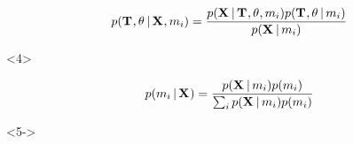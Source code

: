 \begin{frame}[t]
\begin{minipage}[t][0.35\textheight][t]{\linewidth}
\begin{uncoverenv}
\begin{displaybox}[0.85\linewidth]
\begin{minipage}[c][0.1\textheight][c]{\linewidth}
\begin{onlyenv}
                        \[
                            p(
                              \divTimeMapVector,
                              \allParameters{}
                              \given \alignmentVector, \divModel{i})
                              =
                            \frac{
                                p(\alignmentVector \given
                                  \divTimeMapVector,
                                  \allParameters{},
                                  \divModel{i}
                                  )
                                  p(
                                    \divTimeMapVector,
                                    \allParameters{}
                                    \given \divModel{i}
                                    )
                                }{p(\alignmentVector \given \divModel{i})}
                        \]
                    \end{onlyenv}
                    \begin{onlyenv}<4>

                        \vspace{3.5mm}

                        \[
                            p(\divModel{i} \given \alignmentVector) =
                            \frac{
                                p(\alignmentVector \given \divModel{i})
                                p(\divModel{i})
                            }{
                                \sum_{i} p(\alignmentVector \given \divModel{i})
                                p(\divModel{i})
                            }
                        \]
                    \end{onlyenv}
                    \begin{onlyenv}<5->

                        \vspace{2mm}


\end{onlyenv}
\end{minipage}
\end{displaybox}
\end{uncoverenv}
\end{minipage}
\end{frame}
